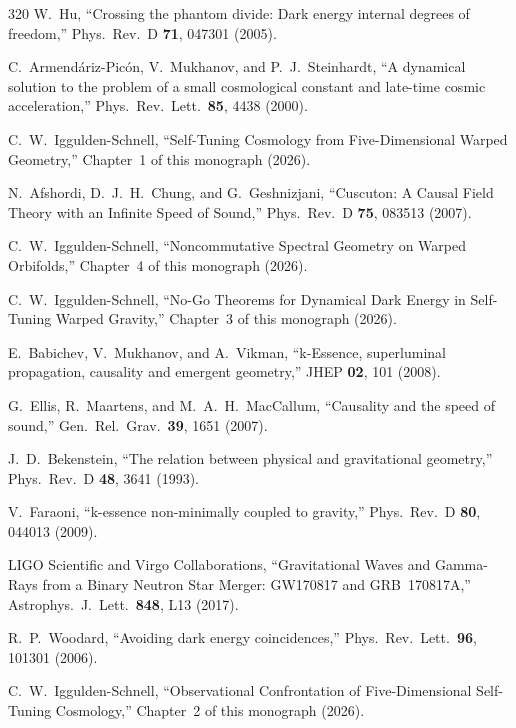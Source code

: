 \begin{thebibliography}{320}
W.~Hu,
``Crossing the phantom divide: Dark energy internal degrees of freedom,''
Phys.\ Rev.\ D \textbf{71}, 047301 (2005).

C.~Armend\'{a}riz-Pic\'{o}n, V.~Mukhanov, and P.~J.~Steinhardt,
``A dynamical solution to the problem of a small cosmological constant and late-time cosmic acceleration,''
Phys.\ Rev.\ Lett.\ \textbf{85}, 4438 (2000).

C.~W.~Iggulden-Schnell,
``Self-Tuning Cosmology from Five-Dimensional Warped Geometry,''
Chapter~1 of this monograph (2026).

N.~Afshordi, D.~J.~H.~Chung, and G.~Geshnizjani,
``Cuscuton: A Causal Field Theory with an Infinite Speed of Sound,''
Phys.\ Rev.\ D \textbf{75}, 083513 (2007).

C.~W.~Iggulden-Schnell,
``Noncommutative Spectral Geometry on Warped Orbifolds,''
Chapter~4 of this monograph (2026).

C.~W.~Iggulden-Schnell,
``No-Go Theorems for Dynamical Dark Energy in Self-Tuning Warped Gravity,''
Chapter~3 of this monograph (2026).

E.~Babichev, V.~Mukhanov, and A.~Vikman,
``k-Essence, superluminal propagation, causality and emergent geometry,''
JHEP \textbf{02}, 101 (2008).

G.~Ellis, R.~Maartens, and M.~A.~H.~MacCallum,
``Causality and the speed of sound,''
Gen.\ Rel.\ Grav.\ \textbf{39}, 1651 (2007).

J.~D.~Bekenstein,
``The relation between physical and gravitational geometry,''
Phys.\ Rev.\ D \textbf{48}, 3641 (1993).

V.~Faraoni,
``k-essence non-minimally coupled to gravity,''
Phys.\ Rev.\ D \textbf{80}, 044013 (2009).

LIGO Scientific and Virgo Collaborations,
``Gravitational Waves and Gamma-Rays from a Binary Neutron Star Merger: GW170817 and GRB~170817A,''
Astrophys.\ J.\ Lett.\ \textbf{848}, L13 (2017).

R.~P.~Woodard,
``Avoiding dark energy coincidences,''
Phys.\ Rev.\ Lett.\ \textbf{96}, 101301 (2006).

C.~W.~Iggulden-Schnell,
``Observational Confrontation of Five-Dimensional Self-Tuning Cosmology,''
Chapter~2 of this monograph (2026).


\end{thebibliography}
